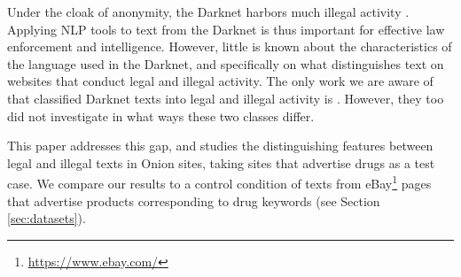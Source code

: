 \documentclass[11pt,a4paper,table]{article}
\newcommand{\es}[1]{\footnote{\color{purple}ES: #1}}
\begin{document}
  Under the cloak of anonymity, the Darknet harbors much illegal activity \citep{moore2016cryptopolitik}.
  Applying NLP tools to text from the Darknet is thus important for effective law enforcement and intelligence.
  However, little is known about the characteristics of the language used in the Darknet, 
  and specifically on what distinguishes text on websites that conduct legal and illegal activity.
	The only work we are aware of that classified Darknet texts into legal and illegal activity is \citet{Avarikioti18}.
	However, they too did not investigate in what ways these two classes differ.
  
  
  This paper addresses this gap, and studies the distinguishing features between legal and illegal texts in Onion sites,
  taking sites that advertise drugs as a test case. We compare our results to a control condition of texts 
  from eBay\footnote{\url{https://www.ebay.com/}} pages that 
	advertise products corresponding to drug keywords (see Section \ref{sec:datasets}).
 
\end{document}
